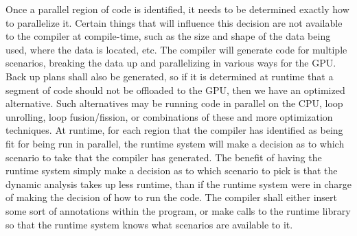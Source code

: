 \documentclass[a4paper,12pt]{article}
\newcommand{\tab}{\hspace*{2em}}
\begin{document}
\newline\tab
Once a parallel region of code is identified, it needs to be determined exactly how to parallelize it.  Certain things that will influence this decision are not available to the compiler at compile-time, such as the size and shape of the data being used, where the data is located, etc.  The compiler will generate code for multiple scenarios, breaking the data up and parallelizing in various ways for the GPU.  Back up plans shall also be generated, so if it is determined at runtime that a segment of code should not be offloaded to the GPU, then we have an optimized alternative.  Such alternatives may be running code in parallel on the CPU, loop unrolling, loop fusion/fission, or combinations of these and more optimization techniques.  
\newline\tab
At runtime, for each region that the compiler has identified as being fit for being run in parallel, the runtime system will make a decision as to which scenario to take that the compiler has generated.  The benefit of having the runtime system simply make a decision as to which scenario to pick is that the dynamic analysis takes up less runtime, than if the runtime system were in charge of making the decision of how to run the code.  The compiler shall either insert some sort of annotations within the program, or make calls to the runtime library so that the runtime system knows what scenarios are available to it.
\newline\tab
\end{document}
